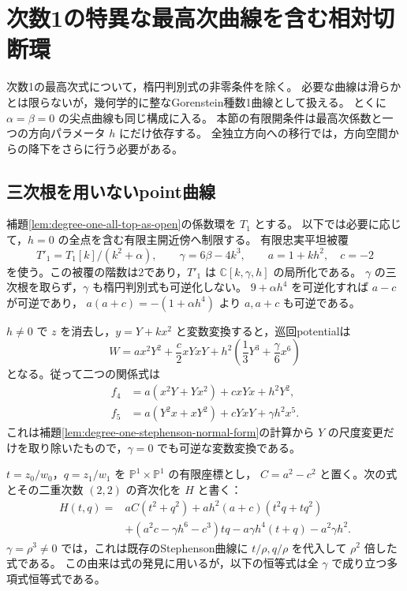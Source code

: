 \section{次数1の特異な最高次曲線を含む相対切断環}
\label{sec:degree-one-integral-curve}

次数1の最高次式について，楕円判別式の非零条件を除く。
必要な曲線は滑らかとは限らないが，幾何学的に整なGorenstein種数1曲線として扱える。
とくに $\alpha=\beta=0$ の尖点曲線も同じ構成に入る。
本節の有限開条件は最高次係数と一つの方向パラメータ $h$ にだけ依存する。
全独立方向への移行では，方向空間からの降下をさらに行う必要がある。

\subsection{三次根を用いないpoint曲線}

補題\ref{lem:degree-one-all-top-as-open}の係数環を $T_1$ とする。
以下では必要に応じて，$h=0$ の全点を含む有限主開近傍へ制限する。
有限忠実平坦被覆
\[
 T'_1=T_1[k]/(k^2+\alpha),\qquad
 \gamma=6\beta-4k^3,\qquad a=1+kh^2,\quad c=-2
\]
を使う。この被覆の階数は2であり，$T'_1$ は
$\mathbb C[k,\gamma,h]$ の局所化である。
$\gamma$ の三次根を取らず，$\gamma$ も楕円判別式も可逆化しない。
$9+\alpha h^4$ を可逆化すれば $a-c$ が可逆であり，
$a(a+c)=-(1+\alpha h^4)$ より $a,a+c$ も可逆である。

$h\ne0$ で $z$ を消去し，$y=Y+kx^2$ と変数変換すると，巡回potentialは
\[
 W=a x^2Y^2+\frac c2xYxY
       +h^2\left(\frac13Y^3+\frac\gamma6x^6\right)
\]
となる。従って二つの関係式は
\begin{equation}\label{eq:degree-one-unscaled-relations}
 \begin{aligned}
 f_4&=a(x^2Y+Yx^2)+cxYx+h^2Y^2,\\
 f_5&=a(Y^2x+xY^2)+cYxY+\gamma h^2x^5.
 \end{aligned}
\end{equation}
これは補題\ref{lem:degree-one-stephenson-normal-form}の計算から
$Y$ の尺度変更だけを取り除いたもので，$\gamma=0$ でも可逆な変数変換である。

$t=z_0/w_0$，$q=z_1/w_1$ を
$\mathbb P^1\times\mathbb P^1$ の有限座標とし，
$C=a^2-c^2$ と置く。次の式とその二重次数 $(2,2)$ の斉次化を $H$ と書く：
\begin{equation}\label{eq:degree-one-integral-point-curve}
 \begin{split}
 H(t,q)={}&aC(t^2+q^2)+ah^2(a+c)(t^2q+tq^2)\\
 &+(a^2c-\gamma h^6-c^3)tq
     -a\gamma h^4(t+q)-a^2\gamma h^2.
 \end{split}
\end{equation}
$\gamma=\rho^3\ne0$ では，これは既存のStephenson曲線に
$t/\rho,q/\rho$ を代入して $\rho^2$ 倍した式である。
この由来は式の発見に用いるが，以下の恒等式は全 $\gamma$ で成り立つ多項式恒等式である。

